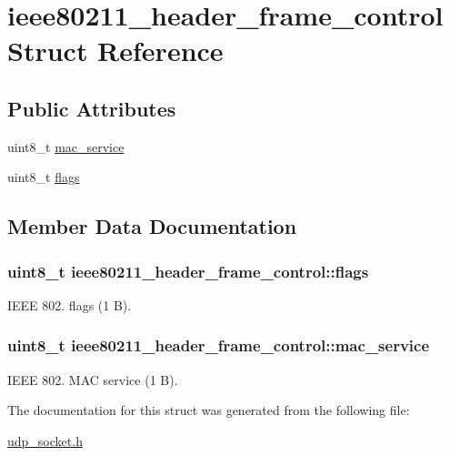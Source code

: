 \hypertarget{structieee80211__header__frame__control}{\section{ieee80211\-\_\-header\-\_\-frame\-\_\-control \-Struct \-Reference}
\label{structieee80211__header__frame__control}
}
\subsection*{\-Public \-Attributes}
\begin{DoxyCompactItemize}
\item 
uint8\-\_\-t \hyperlink{structieee80211__header__frame__control_a8dff16499ab2c4f9806db64b0e086735}{mac\-\_\-service}
\item 
uint8\-\_\-t \hyperlink{structieee80211__header__frame__control_ad535438acacb2db0ce5aea6aca6a3e26}{flags}
\end{DoxyCompactItemize}


\subsection{\-Member \-Data \-Documentation}
\hypertarget{structieee80211__header__frame__control_ad535438acacb2db0ce5aea6aca6a3e26}{
\subsubsection[{flags}]{\setlength{\rightskip}{0pt plus 5cm}uint8\-\_\-t {\bf ieee80211\-\_\-header\-\_\-frame\-\_\-control\-::flags}}}\label{structieee80211__header__frame__control_ad535438acacb2db0ce5aea6aca6a3e26}
\-I\-E\-E\-E 802. flags (1 \-B). \hypertarget{structieee80211__header__frame__control_a8dff16499ab2c4f9806db64b0e086735}{
\subsubsection[{mac\-\_\-service}]{\setlength{\rightskip}{0pt plus 5cm}uint8\-\_\-t {\bf ieee80211\-\_\-header\-\_\-frame\-\_\-control\-::mac\-\_\-service}}}\label{structieee80211__header__frame__control_a8dff16499ab2c4f9806db64b0e086735}
\-I\-E\-E\-E 802. \-M\-A\-C service (1 \-B). 

\-The documentation for this struct was generated from the following file\-:\begin{DoxyCompactItemize}
\item 
\hyperlink{udp__socket_8h}{udp\-\_\-socket.\-h}\end{DoxyCompactItemize}
